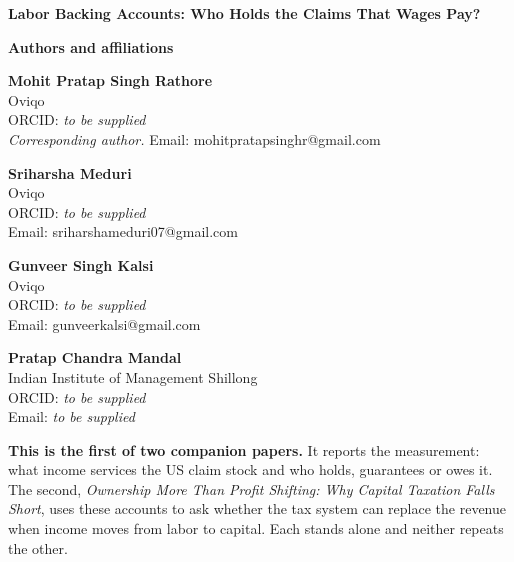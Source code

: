 \documentclass[11pt]{article}
\newif\ifthreeauth
\begin{document}
\begin{center}
{\LARGE\bfseries Labor Backing Accounts: Who Holds the Claims That Wages Pay?}
\end{center}

\vspace{1.5em}

\noindent\textbf{Authors and affiliations}

\vspace{0.5em}

\noindent
\textbf{Mohit Pratap Singh Rathore}\\
Oviqo\\
ORCID: \textit{to be supplied}\\
\textit{Corresponding author.} Email: mohitpratapsinghr@gmail.com

\vspace{0.8em}

\noindent
\textbf{Sriharsha Meduri}\\
Oviqo\\
ORCID: \textit{to be supplied}\\
Email: sriharshameduri07@gmail.com

\vspace{0.8em}

\noindent
\textbf{Gunveer Singh Kalsi}\\
Oviqo\\
ORCID: \textit{to be supplied}\\
Email: gunveerkalsi@gmail.com

\ifthreeauth\else
\vspace{0.8em}

\noindent
\textbf{Pratap Chandra Mandal}\\
Indian Institute of Management Shillong\\
ORCID: \textit{to be supplied}\\
Email: \textit{to be supplied}
\fi

\vspace{1em}

\noindent\textbf{This is the first of two companion papers.} It reports the measurement: what
income services the US claim stock and who holds, guarantees or owes it. The second,
\textit{Ownership More Than Profit Shifting: Why Capital Taxation Falls Short}, uses
these accounts to ask whether the tax system can replace the revenue when income moves from
labor to capital. Each stands alone and neither repeats the other.

\vspace{0.5em}
\end{document}
